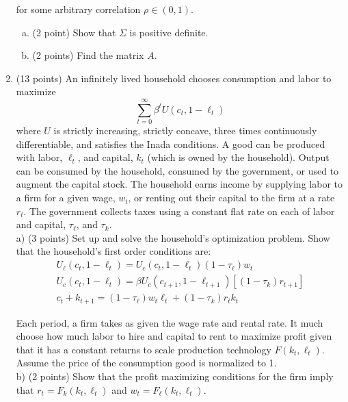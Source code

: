\documentclass[12pt]{article}
\begin{document}
\begin{enumerate}[1.]
for some arbitrary correlation $\rho \in (0, 1)$.

	\begin{enumerate}[a)]
		\item (2 point) Show that $\Sigma$ is positive definite.
		\item (2 points) Find the matrix $A$.
	\end{enumerate}

\item (13 points) An infinitely lived household chooses consumption and labor to maximize
\[\sum_{t=0}^{\infty} \beta^{t} U(c_{t}, 1-\ell_{t})\]
where $U$ is strictly increasing, strictly concave, three times continuously differentiable, and satisfies the Inada conditions. A good can be produced with labor, $\ell_{t}$, and capital, $k_{t}$ (which is owned by the household). Output can be consumed by the household, consumed by the government, or used to augment the capital stock. The household earns income by supplying labor to a firm for a given wage, $w_{t}$, or renting out their capital to the firm at a rate $r_{t}$. The government collects taxes using a constant flat rate on each of labor and capital, $\tau_{\ell}$, and $\tau_{k}$. \\

a) (3 points) Set up and solve the household's optimization problem. Show that the household's first order conditions are:
\begin{gather*}
U_{\ell}(c_{t}, 1-\ell_{t}) = U_{c}(c_{t}, 1-\ell_{t}) (1-\tau_{\ell})w_{t}\\
U_{c}(c_{t}, 1-\ell_{t}) = \beta U_{c}(c_{t+1}, 1-\ell_{t+1})\left[(1-\tau_{k})r_{t+1}\right]\\
c_{t} + k_{t+1} = (1-\tau_{\ell})w_{t}\ell_{t} + (1-\tau_{k})r_{t}k_{t}
\end{gather*}

Each period, a firm takes as given the wage rate and rental rate. It much choose how much labor to hire and capital to rent to maximize profit given that it has a constant returns to scale production technology $F(k_{t}, \ell_{t})$. Assume the price of the consumption good is normalized to 1. \\

b) (2 points) Show that the profit maximizing conditions for the firm imply that $r_{t} = F_{k}(k_{t}, \ell_{t})$ and $w_{t} = F_{\ell}(k_{t}, \ell_{t})$.\\


\end{enumerate}
\end{document}
